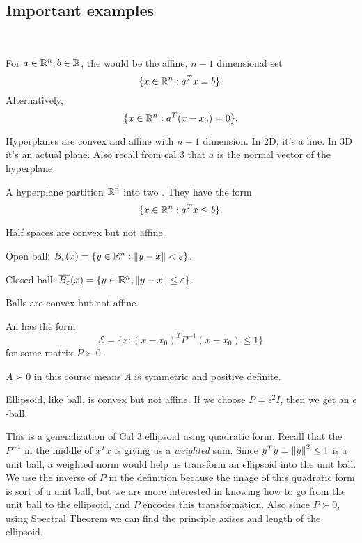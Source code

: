 \documentclass[class=article,crop=false]{standalone}
\begin{document}
\subsection{Important examples}
~\begin{defn}[hyperplane]
	For $  a \in \mathbb{R}^{n}, b \in \mathbb{R}$, the  would be the affine, $ n-1$ dimensional set
 \[
\{x \in \mathbb{R}^{n}: a^{T} x =b\} 
.\] 
Alternatively,
\[
	\{x \in \mathbb{R}^{n}: a^{T} (x - x_0) =0\} 
.\] 
\end{defn}
\begin{note}
Hyperplanes are convex and affine with $ n-1$ dimension. In 2D, it's a line. In 3D it's an actual plane. Also recall from cal 3 that $ a$ is the normal vector of the hyperplane.
\end{note}

\begin{defn}
A hyperplane partition $ \mathbb{R}^{n}$ into two . They have the form 
\[
	\{x \in \mathbb{R}^{n}: a^{T} x \leq b\}
.\] 
\end{defn}
\begin{note}
Half spaces are convex but not affine.
\end{note}
\begin{defn}
Open ball: $ B_{ \varepsilon} ( x ) = \{y \in \mathbb{R}^{n}: {\left\lVert{ y-x}\right\rVert} < \varepsilon\} $.

Closed ball: $ \overline{ B_{ \varepsilon} } (x) = \{ y \in \mathbb{R}^{n}, {\left\lVert{ y- x}\right\rVert} \leq \varepsilon\} $.
\end{defn}
\begin{note}
Balls are convex but not affine.
\end{note}
\newpage
\begin{defn}[ellipsoid]
	An  has the form 
\[
	\mathcal{ E} = \{x: (x-x_0)^{T} P^{-1} (x-x_0) \leq 1\} 
\]
for some matrix $ P \succ 0$.
\end{defn}
\begin{notation}
	$A \succ 0$ in this course means $ A$ is symmetric and positive definite. 
\end{notation}
\begin{note}
Ellipsoid, like ball, is convex but not affine. If we choose $ P = \epsilon^2 I$, then we get an $ \epsilon$-ball.
\end{note}
\begin{intuition}
	This is a generalization of Cal 3 ellipsoid using quadratic form. Recall that the $P^{-1}$ in the middle of $ x^{T} x$ is giving us a \emph{weighted} sum. Since $ y^{T} y = {\left\lVert{ y}\right\rVert}^2  \leq 1$ is a unit ball, a weighted norm would help us transform an ellipsoid into the unit ball. We use the inverse of $ P$ in the definition because the image of this quadratic form is sort of a unit ball, but we are more interested in knowing how to go from the unit ball to the ellipsoid, and $ P$ encodes this transformation.  Also since $ P \succ 0$, using Spectral Theorem we can find the principle axises and length of the ellipsoid.
\end{intuition}
\end{document}
